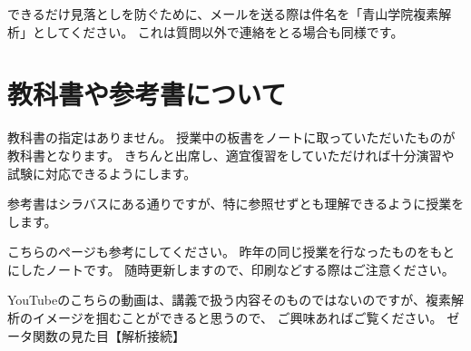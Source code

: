 \documentclass{ltjsarticle}
\begin{document}
できるだけ見落としを防ぐために、メールを送る際は件名を「青山学院複素解析」としてください。
これは質問以外で連絡をとる場合も同様です。

\section*{教科書や参考書について}

教科書の指定はありません。
授業中の板書をノートに取っていただいたものが教科書となります。
きちんと出席し、適宜復習をしていただければ十分演習や試験に対応できるようにします。

参考書はシラバスにある通りですが、特に参照せずとも理解できるように授業をします。

こちらのページも参考にしてください。
昨年の同じ授業を行なったものをもとにしたノートです。
随時更新しますので、印刷などする際はご注意ください。

YouTubeのこちらの動画は、講義で扱う内容そのものではないのですが、複素解析のイメージを掴むことができると思うので、
ご興味あればご覧ください。
ゼータ関数の見た目【解析接続】
\end{document}
